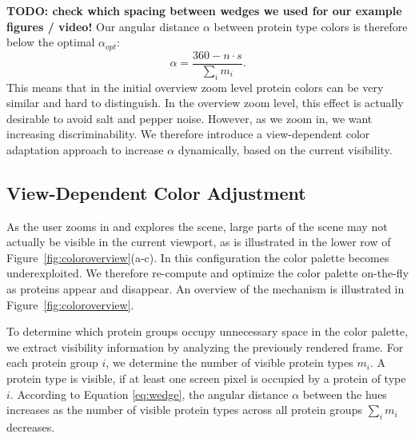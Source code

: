 \documentclass{egpubl}
\begin{document}
	\textbf{TODO: check which spacing between wedges we used for our example figures / video!} 
	Our angular distance  $\alpha$ between protein type colors is therefore below the optimal $\alpha_{opt}$: 
	\begin{equation}%
	\alpha= \frac{360  - n \cdot s}{\sum_{i} m_i}. %
	\label{eq:wedge}%
	\end{equation}%
	This means that in the initial overview zoom level protein colors can be very similar and hard to distinguish. 
	In the overview zoom level, this effect is actually desirable to avoid salt and pepper noise. 
	However, as we zoom in, we want increasing discriminability. 
	We therefore introduce a view-dependent color adaptation approach to increase $\alpha$ dynamically, based on the current visibility.  %
	
	\subsection{View-Dependent Color Adjustment}
	\label{sec:dynamic}
	
	As the user zooms in and explores the scene, large parts of the scene may not actually be visible in the current viewport, as is illustrated in the lower row of Figure~\ref{fig:coloroverview}(a-c).
	In this configuration the color palette becomes underexploited. %
	We therefore re-compute and optimize the color palette on-the-fly as proteins appear and disappear.
	An overview of the mechanism is illustrated in Figure~\ref{fig:coloroverview}.
	
	
	To determine which protein groups occupy unnecessary space in the color palette, we extract visibility information by analyzing the previously rendered frame.
	For each protein group $i$, we determine the number of visible protein types $m_i$. 
	A protein type is visible, if at least one screen pixel is occupied by a protein of type $i$. 
	According to Equation \ref{eq:wedge}, the angular distance $\alpha$ between the hues increases as the number of visible protein types across all protein groups $\sum_{i} m_i$ decreases. 
	
\end{document}
